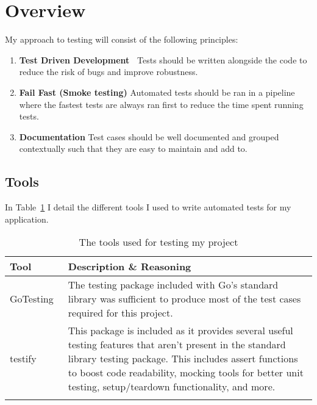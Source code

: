 \section{Overview}

My approach to testing will consist of the following principles:

\begin{enumerate}
  \item \textbf{Test Driven Development~\cite{beck_test-driven_2003}} Tests should be written alongside the code to reduce the risk of bugs and improve robustness.
  \item \textbf{Fail Fast (Smoke testing)} Automated tests should be ran in a pipeline where the fastest tests are always ran first to reduce the time spent running tests.
  \item \textbf{Documentation} Test cases should be well documented and grouped contextually such that they are easy to maintain and add to.
\end{enumerate}

\subsection*{Tools}

In Table~\ref{tab:tools-testing} I detail the different tools I used to write automated tests for my application.

\begin{longtable}{p{} p{}}
  \toprule
  \textbf{Tool} & \textbf{Description \& Reasoning}
  \\\midrule\midrule
  Go\newline Testing~\cite{noauthor_testing_nodate}
  & The testing package included with Go's standard library was sufficient to produce most of the test cases required for this project.
  \\
  testify~\cite{noauthor_testify_2023}
  & This package is included as it provides several useful testing features that aren't present in the standard library testing package. This includes assert functions to boost code readability, mocking tools for better unit testing, setup/teardown functionality, and more.
  \\\bottomrule\bottomrule
  \caption{The tools used for testing my project}
  \label{tab:tools-testing}
\end{longtable}

